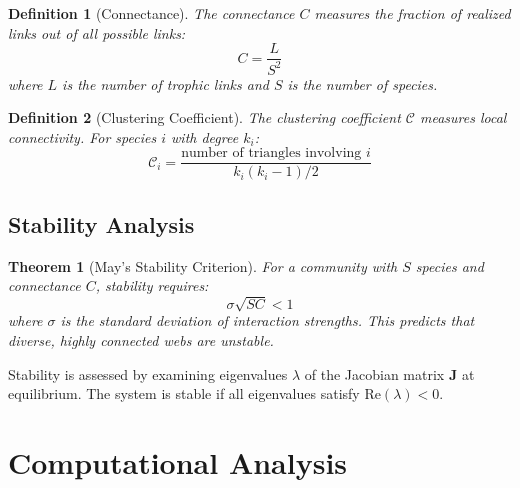 \documentclass[a4paper, 11pt]{article}
\newtheorem{definition}{Definition}[section]
\newtheorem{theorem}{Theorem}[section]
\begin{document}
\begin{definition}[Connectance]
The connectance $C$ measures the fraction of realized links out of all possible links:
\begin{equation}
C = \frac{L}{S^2}
\end{equation}
where $L$ is the number of trophic links and $S$ is the number of species.
\end{definition}

\begin{definition}[Clustering Coefficient]
The clustering coefficient $\mathcal{C}$ measures local connectivity. For species $i$ with degree $k_i$:
\begin{equation}
\mathcal{C}_i = \frac{\text{number of triangles involving } i}{k_i(k_i-1)/2}
\end{equation}
\end{definition}

\subsection{Stability Analysis}

\begin{theorem}[May's Stability Criterion]
For a community with $S$ species and connectance $C$, stability requires:
\begin{equation}
\sigma\sqrt{SC} < 1
\end{equation}
where $\sigma$ is the standard deviation of interaction strengths. This predicts that diverse, highly connected webs are unstable.
\end{theorem}

Stability is assessed by examining eigenvalues $\lambda$ of the Jacobian matrix $\mathbf{J}$ at equilibrium. The system is stable if all eigenvalues satisfy $\text{Re}(\lambda) < 0$.

\section{Computational Analysis}
\end{document}
